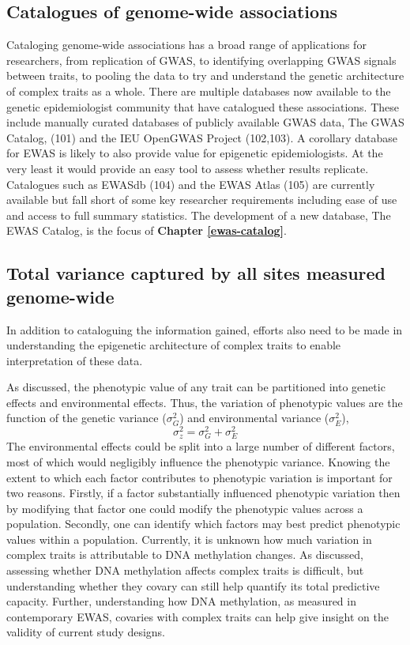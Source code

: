 \documentclass[11pt,oneside]{bristolthesis}
\begin{document}
\hypertarget{gwas-catalog}{%
\subsection{Catalogues of genome-wide associations}\label{gwas-catalog}}

Cataloging genome-wide associations has a broad range of applications for researchers, from replication of GWAS, to identifying overlapping GWAS signals between traits, to pooling the data to try and understand the genetic architecture of complex traits as a whole. There are multiple databases now available to the genetic epidemiologist community that have catalogued these associations. These include manually curated databases of publicly available GWAS data, The GWAS Catalog, (101) and the IEU OpenGWAS Project (102,103). A corollary database for EWAS is likely to also provide value for epigenetic epidemiologists. At the very least it would provide an easy tool to assess whether results replicate. Catalogues such as EWASdb (104) and the EWAS Atlas (105) are currently available but fall short of some key researcher requirements including ease of use and access to full summary statistics. The development of a new database, The EWAS Catalog, is the focus of \textbf{Chapter \ref{ewas-catalog}}.

\hypertarget{heritability}{%
\subsection{Total variance captured by all sites measured genome-wide}\label{heritability}}

In addition to cataloguing the information gained, efforts also need to be made in understanding the epigenetic architecture of complex traits to enable interpretation of these data.

As discussed, the phenotypic value of any trait can be partitioned into genetic effects and environmental effects. Thus, the variation of phenotypic values are the function of the genetic variance (\(\sigma^2_{G}\)) and environmental variance (\(\sigma^2_{E}\)),
\begin{equation}
    \sigma^2_{z} = \sigma^2_{G} + \sigma^2_{E}
    \label{eq:phenotypic-variance}
\end{equation}
The environmental effects could be split into a large number of different factors, most of which would negligibly influence the phenotypic variance. Knowing the extent to which each factor contributes to phenotypic variation is important for two reasons. Firstly, if a factor substantially influenced phenotypic variation then by modifying that factor one could modify the phenotypic values across a population. Secondly, one can identify which factors may best predict phenotypic values within a population. Currently, it is unknown how much variation in complex traits is attributable to DNA methylation changes. As discussed, assessing whether DNA methylation affects complex traits is difficult, but understanding whether they covary can still help quantify its total predictive capacity. Further, understanding how DNA methylation, as measured in contemporary EWAS, covaries with complex traits can help give insight on the validity of current study designs.
\end{document}
